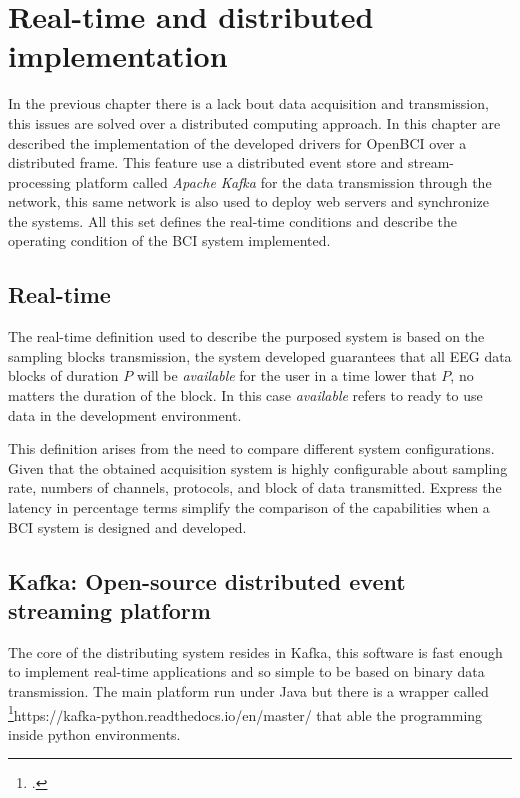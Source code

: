 \chapter{Real-time and distributed implementation}\label{ch:chapter_3}


In the previous chapter there is a lack bout data acquisition and transmission, this 
issues are solved over a distributed computing approach. In this chapter are described the implementation of the developed drivers for OpenBCI over a distributed frame. This feature use a distributed event store and stream-processing platform called \textit{Apache Kafka} for the data transmission through the network, this same network is also used to deploy web servers and synchronize the systems. All this set defines the real-time conditions and describe the operating condition of the BCI system implemented.


\section{Real-time}

The real-time definition used to describe the purposed system is based on the sampling blocks transmission, the system developed guarantees that all EEG data blocks of duration $P$ will be \textit{available} for the user in a time lower that $P$, no matters the duration of the block. In this case \textit{available} refers to ready to use data in the development environment.

This definition arises from the need to compare different system configurations. Given that the obtained acquisition system is highly configurable about sampling rate, numbers of channels, protocols, and block of data transmitted. Express the latency in percentage terms simplify the comparison of the capabilities when a BCI system is designed and developed.

\section{Kafka: Open-source distributed event streaming platform}

The core of the distributing system resides in Kafka, this software is fast enough to implement real-time applications and so simple to be based on binary data transmission. The main platform run under Java but there is a wrapper called \footcite{kafka-python}{https://kafka-python.readthedocs.io/en/master/} that able the programming inside python environments.


